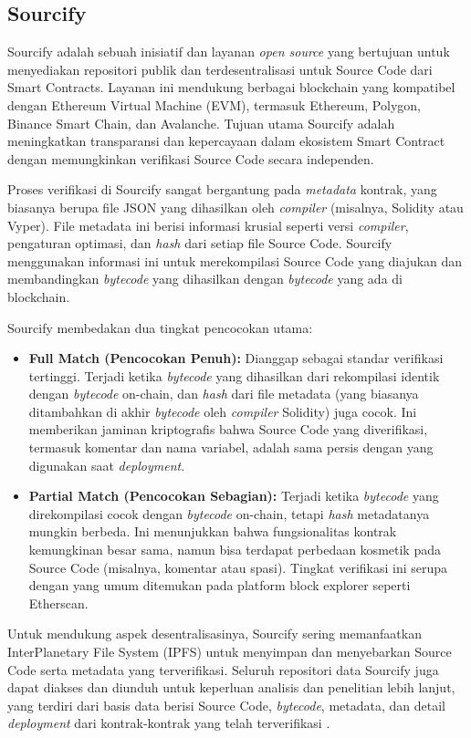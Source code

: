 \subsection{Sourcify}
\label{subsec:sourcify}

Sourcify adalah sebuah inisiatif dan layanan \textit{open source} yang bertujuan untuk menyediakan repositori publik dan terdesentralisasi untuk Source Code dari Smart Contracts. Layanan ini mendukung berbagai blockchain yang kompatibel dengan Ethereum Virtual Machine (EVM), termasuk Ethereum, Polygon, Binance Smart Chain, dan Avalanche. Tujuan utama Sourcify adalah meningkatkan transparansi dan kepercayaan dalam ekosistem Smart Contract dengan memungkinkan verifikasi Source Code secara independen.

Proses verifikasi di Sourcify sangat bergantung pada \textit{metadata} kontrak, yang biasanya berupa file JSON yang dihasilkan oleh \textit{compiler} (misalnya, Solidity atau Vyper). File metadata ini berisi informasi krusial seperti versi \textit{compiler}, pengaturan optimasi, dan \textit{hash} dari setiap file Source Code. Sourcify menggunakan informasi ini untuk merekompilasi Source Code yang diajukan dan membandingkan \textit{bytecode} yang dihasilkan dengan \textit{bytecode} yang ada di blockchain.

Sourcify membedakan dua tingkat pencocokan utama:
\begin{itemize}
	\item \textbf{Full Match (Pencocokan Penuh):} Dianggap sebagai standar verifikasi tertinggi. Terjadi ketika \textit{bytecode} yang dihasilkan dari rekompilasi identik dengan \textit{bytecode} on-chain, dan \textit{hash} dari file metadata (yang biasanya ditambahkan di akhir \textit{bytecode} oleh \textit{compiler} Solidity) juga cocok. Ini memberikan jaminan kriptografis bahwa Source Code yang diverifikasi, termasuk komentar dan nama variabel, adalah sama persis dengan yang digunakan saat \textit{deployment}.
	\item \textbf{Partial Match (Pencocokan Sebagian):} Terjadi ketika \textit{bytecode} yang direkompilasi cocok dengan \textit{bytecode} on-chain, tetapi \textit{hash} metadatanya mungkin berbeda. Ini menunjukkan bahwa fungsionalitas kontrak kemungkinan besar sama, namun bisa terdapat perbedaan kosmetik pada Source Code (misalnya, komentar atau spasi). Tingkat verifikasi ini serupa dengan yang umum ditemukan pada platform block explorer seperti Etherscan.
\end{itemize}

Untuk mendukung aspek desentralisasinya, Sourcify sering memanfaatkan InterPlanetary File System (IPFS) untuk menyimpan dan menyebarkan Source Code serta metadata yang terverifikasi. Seluruh repositori data Sourcify juga dapat diakses dan diunduh untuk keperluan analisis dan penelitian lebih lanjut, yang terdiri dari basis data berisi Source Code, \textit{bytecode}, metadata, dan detail \textit{deployment} dari kontrak-kontrak yang telah terverifikasi \parencite{sourcify_website}.